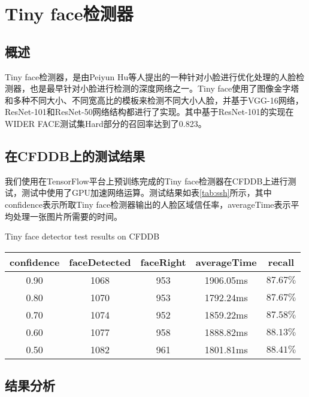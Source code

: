 \section{Tiny face检测器}

\subsection{概述}

Tiny face检测器\cite{hu2017finding}，是由Peiyun Hu等人提出的一种针对小脸进行优化处理的人脸检测器，也是最早针对小脸进行检测的深度网络之一。Tiny face使用了图像金字塔和多种不同大小、不同宽高比的模板来检测不同大小人脸，并基于VGG-16网络\cite{simonyan2014very}，ResNet-101和ResNet-50网络\cite{he2016deep}结构都进行了实现。其中基于ResNet-101的实现在WIDER FACE测试集Hard部分的召回率达到了0.823\cite{hu2017finding}。

\subsection{在CFDDB上的测试结果}
\label{chap2:tinyresult}

我们使用在TensorFlow平台上预训练完成的Tiny face检测器在CFDDB上进行测试，测试中使用了GPU加速网络运算。测试结果如表\ref{tab:ssh}所示，其中confidence表示所取Tiny face检测器输出的人脸区域信任率，averageTime表示平均处理一张图片所需要的时间。

\begin{table}[!hpb]
	\centering
	{Tiny face detector test results on CFDDB}
	\label{tab:tiny}
	\begin{tabular}{ cccc | c }
		\hline
		confidence & faceDetected & faceRight & averageTime & recall\\
		\hline
		0.90 & 1068 & 953 & 1906.05ms & $87.67\%$\\
		0.80 & 1070 & 953 & 1792.24ms & $87.67\%$\\
		0.70 & 1074 & 952 & 1859.22ms & $87.58\%$\\
		0.60 & 1077 & 958 & 1888.82ms & $88.13\%$\\
		0.50 & 1082 & 961 & 1801.81ms & $88.41\%$\\
		\hline
	\end{tabular}
\end{table}

\subsection{结果分析}

